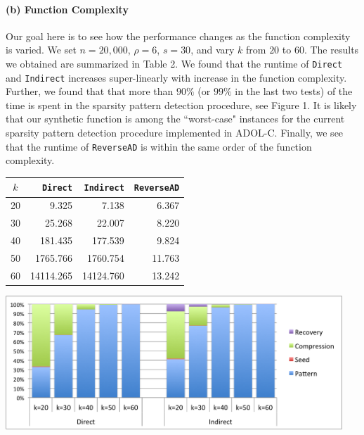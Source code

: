 \documentclass[11pt, a4paper, english]{article}
\begin{document}
\paragraph{(b) Function Complexity} 
Our goal here is to see how the performance changes as the function complexity is varied.
We set $n = 20,000$, $\rho = 6$, $s = 30$, and vary $k$ from $20$ to $60$. 
The results we obtained are summarized in Table 2.
We found that the runtime of {\tt Direct} and {\tt Indirect} increases super-linearly with increase in the function complexity. Further, we found that that more than $90\%$ (or $99\%$ in the last two tests) of the time is spent in the sparsity pattern detection procedure, see Figure 1. It is likely that our synthetic function is among the ``worst-case" instances for the current sparsity pattern detection procedure implemented in ADOL-C.  Finally, we see that the runtime of {\tt ReverseAD} is within the same order of the function complexity.
\begin{minipage}{\textwidth}
  \begin{minipage}[b]{0.45\textwidth}
    \centering
\begin{tabular}{|c|r|r|r|}
\hline
$k$ & {\tt Direct} & {\tt Indirect} & {\tt ReverseAD} \\
\hline
20 & 9.325 & 7.138 & 6.367 \\
30 & 25.268 & 22.007 & 8.220\\
40 & 181.435 & 177.539 & 9.824\\
50 & 1765.766 & 1760.754 & 11.763 \\
60 & 14114.265 & 14124.760 & 13.242\\
\hline
\end{tabular}
\end{minipage}
\begin{minipage}[b]{0.06\textwidth}
\phantom{b}
\end{minipage}
  \begin{minipage}[b]{0.45\textwidth}
    \centering
    \includegraphics[width=0.95\textwidth]{figures/pb}
  \end{minipage}
  \hfill
\end{minipage}
\end{document}
